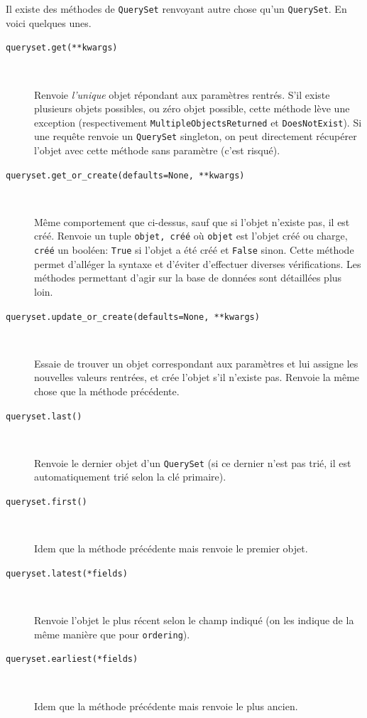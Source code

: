 \documentclass[a4paper, 10pt]{article}
\begin{document}
Il existe des méthodes de \texttt{QuerySet} renvoyant autre chose qu'un \texttt{QuerySet}. En voici quelques unes.

\begin{description}
    \item[\texttt{queryset.get(**kwargs)}]~

        Renvoie \emph{l'unique} objet répondant aux paramètres rentrés. S'il existe plusieurs objets possibles, ou zéro objet possible, cette méthode lève une exception (respectivement \texttt{MultipleObjectsReturned} et \texttt{DoesNotExist}). Si une requête renvoie un \texttt{QuerySet} singleton, on peut directement récupérer l'objet avec cette méthode sans paramètre (c'est risqué).

    \item[\texttt{queryset.get_or_create(defaults=None, **kwargs)}]~

        Même comportement que ci-dessus, sauf que si l'objet n'existe pas, il est créé. Renvoie un tuple \texttt{objet, créé} où \texttt{objet} est l'objet créé ou charge, \texttt{créé} un booléen: \texttt{True} si l'objet a été créé et \texttt{False} sinon. Cette méthode permet d'alléger la syntaxe et d'éviter d'effectuer diverses vérifications. Les méthodes permettant d'agir sur la base de données sont détaillées plus loin.

    \item[\texttt{queryset.update_or_create(defaults=None, **kwargs)}]~

        Essaie de trouver un objet correspondant aux paramètres et lui assigne les nouvelles valeurs rentrées, et crée l'objet s'il n'existe pas. Renvoie la même chose que la méthode précédente.

    \item[\texttt{queryset.last()}]~

        Renvoie le dernier objet d'un \texttt{QuerySet} (si ce dernier n'est pas trié, il est automatiquement trié selon la clé primaire).

    \item[\texttt{queryset.first()}]~

        Idem que la méthode précédente mais renvoie le premier objet.

    \item[\texttt{queryset.latest(*fields)}]~

        Renvoie l'objet le plus récent selon le champ indiqué (on les indique de la même manière que pour \texttt{ordering}).

    \item[\texttt{queryset.earliest(*fields)}]~

        Idem que la méthode précédente mais renvoie le plus ancien.

\end{description}
\end{document}
